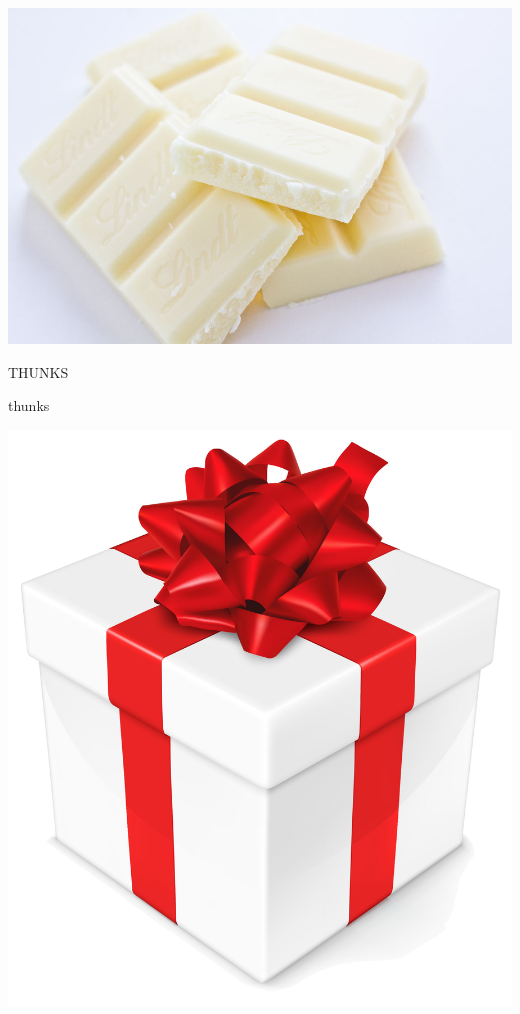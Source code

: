 \documentclass[14pt]{beamer}
\begin{document}
\begin{frame}
\hspace*{-11.2mm}
\includegraphics[width=\paperwidth]{whitechocolate}
\end{frame}

\begin{frame}
\centering
{\fontsize{60}{60}\selectfont THUNKS}
\end{frame}

\begin{frame}
\vspace*{8mm}
\centering
\small thunks 
\end{frame}

\begin{frame}
\centering
\includegraphics[height=\paperheight]{gift} 
\end{frame}
\end{document}
